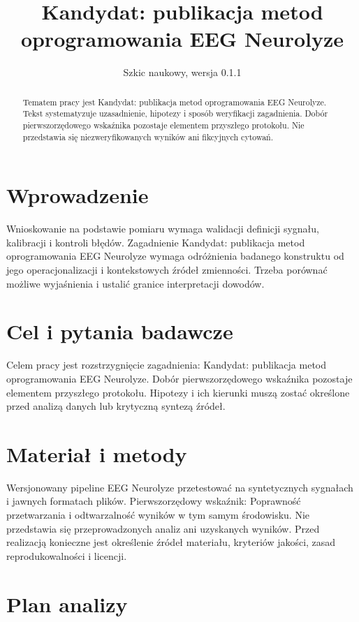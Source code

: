 \documentclass[11pt,a4paper]{article}
\title{Kandydat: publikacja metod oprogramowania EEG Neurolyze}
\author{}
\date{Szkic naukowy, wersja 0.1.1}
\begin{document}
\maketitle

\begin{abstract}

Tematem pracy jest Kandydat: publikacja metod oprogramowania EEG Neurolyze. Tekst systematyzuje uzasadnienie, hipotezy i sposób weryfikacji zagadnienia. Dobór pierwszorzędowego wskaźnika pozostaje elementem przyszłego protokołu. Nie przedstawia się niezweryfikowanych wyników ani fikcyjnych cytowań.

\end{abstract}

\section{Wprowadzenie}

Wnioskowanie na podstawie pomiaru wymaga walidacji definicji sygnału, kalibracji i kontroli błędów. Zagadnienie Kandydat: publikacja metod oprogramowania EEG Neurolyze wymaga odróżnienia badanego konstruktu od jego operacjonalizacji i kontekstowych źródeł zmienności. Trzeba porównać możliwe wyjaśnienia i ustalić granice interpretacji dowodów.

\section{Cel i pytania badawcze}

Celem pracy jest rozstrzygnięcie zagadnienia: Kandydat: publikacja metod oprogramowania EEG Neurolyze. Dobór pierwszorzędowego wskaźnika pozostaje elementem przyszłego protokołu. Hipotezy i ich kierunki muszą zostać określone przed analizą danych lub krytyczną syntezą źródeł.

\section{Materiał i metody}

Wersjonowany pipeline EEG Neurolyze przetestować na syntetycznych sygnałach i jawnych formatach plików. Pierwszorzędowy wskaźnik: Poprawność przetwarzania i odtwarzalność wyników w tym samym środowisku. Nie przedstawia się przeprowadzonych analiz ani uzyskanych wyników. Przed realizacją konieczne jest określenie źródeł materiału, kryteriów jakości, zasad reprodukowalności i licencji.

\section{Plan analizy}
\end{document}
